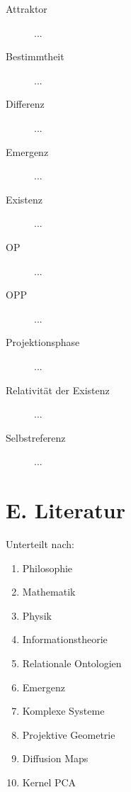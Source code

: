 \begin{description}

\item[Attraktor]

...

\item[Bestimmtheit]

...

\item[Differenz]

...

\item[Emergenz]

...

\item[Existenz]

...

\item[OP]

...

\item[OPP]

...

\item[Projektionsphase]

...

\item[Relativität der Existenz]

...

\item[Selbstreferenz]

...

\end{description}

\part{E. Literatur}

Unterteilt nach:

\begin{enumerate}

\item
Philosophie

\item
Mathematik

\item
Physik

\item
Informationstheorie

\item
Relationale Ontologien

\item
Emergenz

\item
Komplexe Systeme

\item
Projektive Geometrie

\item
Diffusion Maps

\item
Kernel PCA

\end{enumerate}

